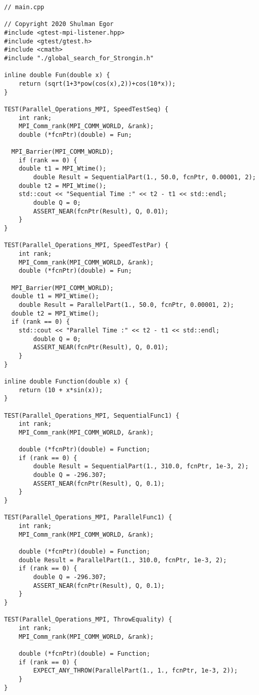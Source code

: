 \documentclass{report}
\begin{document}
\begin{lstlisting}
// main.cpp

// Copyright 2020 Shulman Egor
#include <gtest-mpi-listener.hpp>
#include <gtest/gtest.h>
#include <cmath>
#include "./global_search_for_Strongin.h"

inline double Fun(double x) {
    return (sqrt(1+3*pow(cos(x),2))+cos(10*x));
}

TEST(Parallel_Operations_MPI, SpeedTestSeq) {
    int rank;
    MPI_Comm_rank(MPI_COMM_WORLD, &rank);
    double (*fcnPtr)(double) = Fun;

  MPI_Barrier(MPI_COMM_WORLD);
    if (rank == 0) {
    double t1 = MPI_Wtime();
        double Result = SequentialPart(1., 50.0, fcnPtr, 0.00001, 2);
    double t2 = MPI_Wtime();
    std::cout << "Sequential Time :" << t2 - t1 << std::endl;
        double Q = 0;
        ASSERT_NEAR(fcnPtr(Result), Q, 0.01);
    }
}

TEST(Parallel_Operations_MPI, SpeedTestPar) {
    int rank;
    MPI_Comm_rank(MPI_COMM_WORLD, &rank);
    double (*fcnPtr)(double) = Fun;

  MPI_Barrier(MPI_COMM_WORLD);
  double t1 = MPI_Wtime();
    double Result = ParallelPart(1., 50.0, fcnPtr, 0.00001, 2);
  double t2 = MPI_Wtime();
  if (rank == 0) {
    std::cout << "Parallel Time :" << t2 - t1 << std::endl;
        double Q = 0;
        ASSERT_NEAR(fcnPtr(Result), Q, 0.01);
    }
}

inline double Function(double x) {
    return (10 + x*sin(x));
}

TEST(Parallel_Operations_MPI, SequentialFunc1) {
    int rank;
    MPI_Comm_rank(MPI_COMM_WORLD, &rank);

    double (*fcnPtr)(double) = Function;
    if (rank == 0) {
        double Result = SequentialPart(1., 310.0, fcnPtr, 1e-3, 2);
        double Q = -296.307;
        ASSERT_NEAR(fcnPtr(Result), Q, 0.1);
    }
}

TEST(Parallel_Operations_MPI, ParallelFunc1) {
    int rank;
    MPI_Comm_rank(MPI_COMM_WORLD, &rank);

    double (*fcnPtr)(double) = Function;
    double Result = ParallelPart(1., 310.0, fcnPtr, 1e-3, 2);
    if (rank == 0) {
        double Q = -296.307;
        ASSERT_NEAR(fcnPtr(Result), Q, 0.1);
    }
}

TEST(Parallel_Operations_MPI, ThrowEquality) {
    int rank;
    MPI_Comm_rank(MPI_COMM_WORLD, &rank);

    double (*fcnPtr)(double) = Function;
    if (rank == 0) {
        EXPECT_ANY_THROW(ParallelPart(1., 1., fcnPtr, 1e-3, 2));
    }
}


\end{lstlisting}
\end{document}

